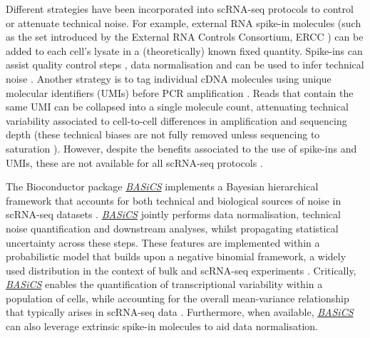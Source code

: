 \documentclass[9pt,a4paper,]{extarticle}
\begin{document}
Different strategies have been incorporated into scRNA-seq protocols to control
or attenuate technical noise.
For example, external RNA spike-in molecules (such as the set introduced by the
External RNA Controls Consortium, ERCC \citep{Rna2005}) can be added to each cell's
lysate in a (theoretically) known fixed quantity.
Spike-ins can assist quality control steps \citep{McCarthy2017}, data normalisation
\citep{Vallejos2017} and can be used to infer technical noise \citep{Brennecke2013}.
Another strategy is to tag individual cDNA molecules using unique molecular
identifiers (UMIs) before PCR amplification \citep{Islam2014}.
Reads that contain the same UMI can be collapsed into a single molecule count,
attenuating technical variability associated to cell-to-cell differences
in amplification and sequencing depth (these technical biases are not fully
removed unless sequencing to saturation \citep{Vallejos2017}).
However, despite the benefits associated to the use of spike-ins and UMIs,
these are not available for all scRNA-seq protocols \citep{Haque2017}.

The Bioconductor package \emph{\href{https://bioconductor.org/packages/3.11/BASiCS}{BASiCS}} implements a Bayesian
hierarchical framework that accounts for both technical and biological sources
of noise in scRNA-seq datasets \citep{Vallejos2015, Vallejos2016, Eling2017}.
\emph{\href{https://bioconductor.org/packages/3.11/BASiCS}{BASiCS}} jointly performs data normalisation, technical noise
quantification and downstream analyses, whilst propagating statistical
uncertainty across these steps.
These features are implemented within a probabilistic model that builds upon a
negative binomial framework, a widely used distribution in the context of bulk
and scRNA-seq experiments \citep{Svensson2020, Townes2020, Townes2019}.
Critically, \emph{\href{https://bioconductor.org/packages/3.11/BASiCS}{BASiCS}} enables the quantification of transcriptional
variability within a population of cells, while accounting for the overall
mean-variance relationship that typically arises in scRNA-seq data \citep{Eling2018}.
Furthermore, when available, \emph{\href{https://bioconductor.org/packages/3.11/BASiCS}{BASiCS}} can also leverage extrinsic
spike-in molecules to aid data normalisation.
\end{document}

